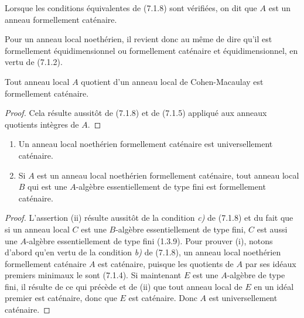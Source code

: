 \begin{definition}[7.1.9]
\label{IV.2.s7.1.9-fr}
Lorsque les conditions équivalentes de \textup{(7.1.8)} sont vérifiées, on dit que
$A$ est un anneau formellement caténaire.
\end{definition}

Pour un anneau local noethérien, il revient donc au même de dire qu'il est
formellement équidimensionnel ou formellement caténaire et
équidimensionnel, en vertu de (7.1.2).

\begin{proposition}[7.1.10]
\label{IV.2.s7.1.10-fr}
Tout anneau local $A$ quotient d'un anneau local de Cohen-Macaulay est
formellement caténaire.
\end{proposition}

\begin{proof}
Cela résulte aussitôt de (7.1.8) et de (7.1.5) appliqué aux anneaux
quotients intègres de $A$.
\end{proof}

\begin{proposition}[7.1.11]
\label{IV.2.s7.1.11-fr}
\begin{enumerate}
\item[\textup{(i)}] Un anneau local noethérien formellement caténaire est universellement
caténaire.
\item[\textup{(ii)}] Si $A$ est un anneau local noethérien formellement caténaire, tout
anneau local $B$ qui est une $A$-algèbre essentiellement de type fini est
formellement caténaire.
\end{enumerate}
\end{proposition}

\begin{proof}
L'assertion (ii) résulte aussitôt de la condition \emph{c)} de (7.1.8) et du fait
que si un anneau local $C$ est une $B$-algèbre essentiellement de type
fini, $C$ est aussi une $A$-algèbre essentiellement de type fini (1.3.9).
Pour prouver (i), notons d'abord qu'en vertu de la condition \emph{b)} de (7.1.8),
un anneau local noethérien formellement caténaire $A$ est caténaire,
puisque les quotients de $A$ par ses idéaux premiers minimaux le sont
(7.1.4). Si maintenant $E$ est une $A$-algèbre de type fini, il résulte de
ce qui précède et de (ii) que tout anneau local de $E$ en un idéal premier
est caténaire, donc que $E$ est caténaire. Donc $A$ est universellement
caténaire.
\end{proof}


